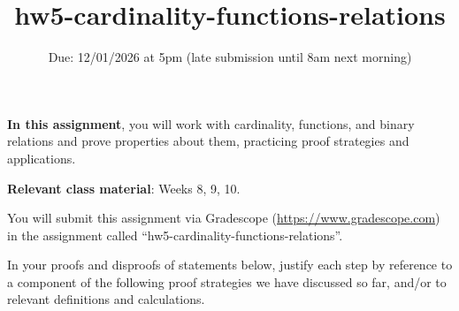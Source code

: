 


\title{hw5-cardinality-functions-relations}
\date{Due: 12/01/2026 at 5pm (late submission until 8am next morning)}

\maketitle
\thispagestyle{fancy}


{\bf In this assignment},  you will work with cardinality, functions, and binary relations and prove 
properties about them, practicing proof strategies and applications.


{\bf Relevant class material}: Weeks 8, 9, 10.

You will submit this assignment via Gradescope
(\href{https://www.gradescope.com}{https://www.gradescope.com}) 
in the assignment called ``hw5-cardinality-functions-relations''.

\instructions

In your proofs and disproofs of statements below, justify each  step
by reference to  a component of the  following proof  strategies
we  have discussed so far, and/or to relevant definitions and calculations.

\vspace{-10pt}

